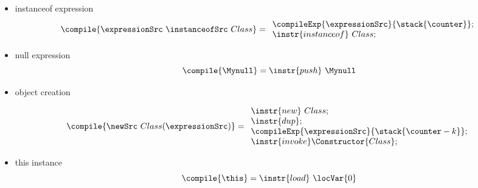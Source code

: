 \begin{itemize}
  \item instanceof expression
    $$ \compile{\expressionSrc \ \instanceofSrc \ Class } = 
         \begin{array}{l}
              \compileExp{\expressionSrc}{\stack{\counter}};\\
                \instr{instanceof} \ Class;
         \end{array} $$
  \item null expression
    $$ \compile{\Mynull } = \instr{push} \ \Mynull$$
          
 
 \item object creation
    
   $$\compile{ \newSrc \ Class (\expressionSrc ) } =
                 \begin{array}{l}
 \instr{new} \ Class; \\ 
		       \instr{dup}; \\
		       \compileExp{\expressionSrc}{\stack{\counter - k}};\\
	               
		       \instr{invoke } \Constructor{Class};     
	       \end{array}$$
 		        
\item this instance
  $$\compile{\this} = \instr{load} \ \locVar{0}$$
              	              
\end{itemize}


